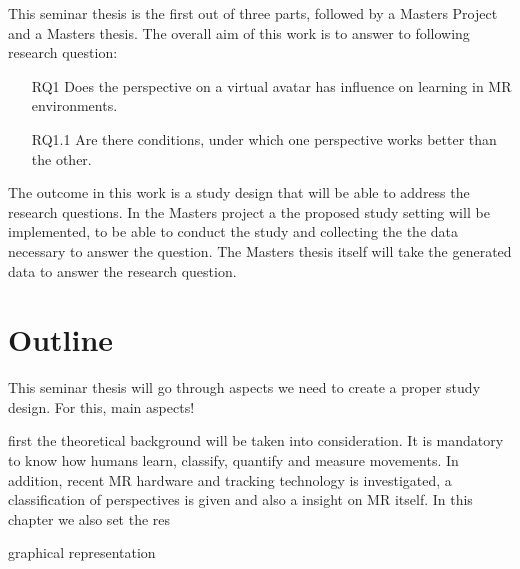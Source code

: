 This seminar thesis is the first out of three parts, followed by a Masters Project and a Masters thesis. The overall aim of this work is to answer to following research question:
\begin{itemize}
	\item[RQ1] Does the perspective on a virtual avatar has influence on learning in MR environments.
	\item[RQ1.1] Are there conditions, under which one perspective works better than the other.
\end{itemize}
The outcome in this work is a study design that will be able to address the research questions. In the Masters project a the proposed study setting will be implemented, to be able to conduct the study and collecting the the data necessary to answer the question. The Masters thesis itself will take the generated data to answer the research question.


\section{Outline}
This seminar thesis will go through aspects we need to create a proper study design. For this, main aspects!

first the theoretical background will be taken into consideration. It is mandatory to know how humans learn, classify, quantify and measure movements. In addition, recent MR hardware and tracking technology is investigated, a classification of perspectives is given and also a insight on MR itself. In this chapter we also set the res


\todo graphical representation

